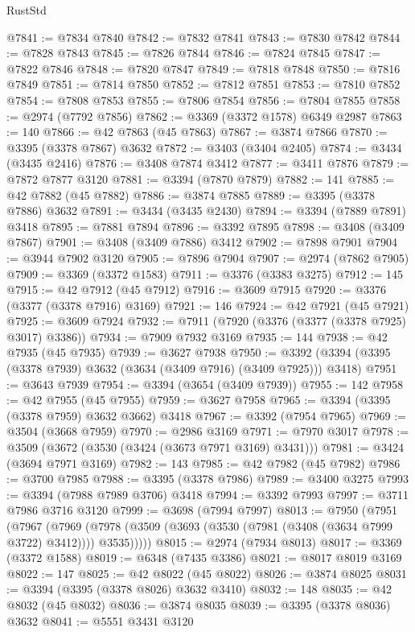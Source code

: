 \begin{lexlean}{RustStd}
\begin{coremodule}
@7841 := @7834 @7840
@7842 := @7832 @7841
@7843 := @7830 @7842
@7844 := @7828 @7843
@7845 := @7826 @7844
@7846 := @7824 @7845
@7847 := @7822 @7846
@7848 := @7820 @7847
@7849 := @7818 @7848
@7850 := @7816 @7849
@7851 := @7814 @7850
@7852 := @7812 @7851
@7853 := @7810 @7852
@7854 := @7808 @7853
@7855 := @7806 @7854
@7856 := @7804 @7855
@7858 := @2974 (@7792 @7856)
@7862 := @3369 (@3372 @1578) @6349 @2987
@7863 := 140
@7866 := @42 @7863 (@45 @7863)
@7867 := @3874 @7866
@7870 := @3395 (@3378 @7867) @3632
@7872 := @3403 (@3404 @2405)
@7874 := @3434 (@3435 @2416)
@7876 := @3408 @7874 @3412
@7877 := @3411 @7876
@7879 := @7872 @7877 @3120
@7881 := @3394 (@7870 @7879)
@7882 := 141
@7885 := @42 @7882 (@45 @7882)
@7886 := @3874 @7885
@7889 := @3395 (@3378 @7886) @3632
@7891 := @3434 (@3435 @2430)
@7894 := @3394 (@7889 @7891) @3418
@7895 := @7881 @7894
@7896 := @3392 @7895
@7898 := @3408 (@3409 @7867)
@7901 := @3408 (@3409 @7886) @3412
@7902 := @7898 @7901
@7904 := @3944 @7902 @3120
@7905 := @7896 @7904
@7907 := @2974 (@7862 @7905)
@7909 := @3369 (@3372 @1583)
@7911 := @3376 (@3383 @3275)
@7912 := 145
@7915 := @42 @7912 (@45 @7912)
@7916 := @3609 @7915
@7920 := @3376 (@3377 (@3378 @7916) @3169)
@7921 := 146
@7924 := @42 @7921 (@45 @7921)
@7925 := @3609 @7924
@7932 := @7911 (@7920 (@3376 (@3377 (@3378 @7925) @3017) @3386))
@7934 := @7909 @7932 @3169
@7935 := 144
@7938 := @42 @7935 (@45 @7935)
@7939 := @3627 @7938
@7950 := @3392 (@3394 (@3395 (@3378 @7939) @3632 (@3634 (@3409 @7916) (@3409 @7925))) @3418)
@7951 := @3643 @7939
@7954 := @3394 (@3654 (@3409 @7939))
@7955 := 142
@7958 := @42 @7955 (@45 @7955)
@7959 := @3627 @7958
@7965 := @3394 (@3395 (@3378 @7959) @3632 @3662) @3418
@7967 := @3392 (@7954 @7965)
@7969 := @3504 (@3668 @7959)
@7970 := @2986 @3169
@7971 := @7970 @3017
@7978 := @3509 (@3672 (@3530 (@3424 (@3673 @7971 @3169) @3431)))
@7981 := @3424 (@3694 @7971 @3169)
@7982 := 143
@7985 := @42 @7982 (@45 @7982)
@7986 := @3700 @7985
@7988 := @3395 (@3378 @7986)
@7989 := @3400 @3275
@7993 := @3394 (@7988 @7989 @3706) @3418
@7994 := @3392 @7993
@7997 := @3711 @7986 @3716 @3120
@7999 := @3698 (@7994 @7997)
@8013 := @7950
    (@7951
      (@7967
        (@7969 (@7978 (@3509 (@3693 (@3530 (@7981 (@3408 (@3634 @7999 @3722) @3412)))) @3535)))))
@8015 := @2974 (@7934 @8013)
@8017 := @3369 (@3372 @1588)
@8019 := @6348 (@7435 @3386)
@8021 := @8017 @8019 @3169
@8022 := 147
@8025 := @42 @8022 (@45 @8022)
@8026 := @3874 @8025
@8031 := @3394 (@3395 (@3378 @8026) @3632 @3410)
@8032 := 148
@8035 := @42 @8032 (@45 @8032)
@8036 := @3874 @8035
@8039 := @3395 (@3378 @8036) @3632
@8041 := @5551 @3431 @3120

\end{coremodule}
\end{lexlean}
